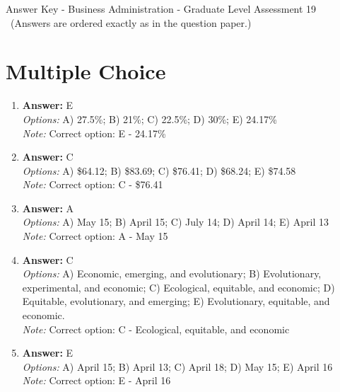 \documentclass[12pt]{article}
\begin{document}
\begin{center}
Answer Key - Business Administration - Graduate Level Assessment 19 \
\small (Answers are ordered exactly as in the question paper.)
\end{center}

\section*{Multiple Choice}
\begin{enumerate}[label=\arabic*.]
\item \textbf{Answer:} E
\\ \textit{Options:} A) 27.5\%; B) 21\%; C) 22.5\%; D) 30\%; E) 24.17\%
\\ \textit{Note:} Correct option: E - 24.17\%
\item \textbf{Answer:} C
\\ \textit{Options:} A) \$64.12; B) \$83.69; C) \$76.41; D) \$68.24; E) \$74.58
\\ \textit{Note:} Correct option: C - \$76.41
\item \textbf{Answer:} A
\\ \textit{Options:} A) May 15; B) April 15; C) July 14; D) April 14; E) April 13
\\ \textit{Note:} Correct option: A - May 15
\item \textbf{Answer:} C
\\ \textit{Options:} A) Economic, emerging, and evolutionary; B) Evolutionary, experimental, and economic; C) Ecological, equitable, and economic; D) Equitable, evolutionary, and emerging; E) Evolutionary, equitable, and economic.
\\ \textit{Note:} Correct option: C - Ecological, equitable, and economic
\item \textbf{Answer:} E
\\ \textit{Options:} A) April 15; B) April 13; C) April 18; D) May 15; E) April 16
\\ \textit{Note:} Correct option: E - April 16
\end{enumerate}
\end{document}
